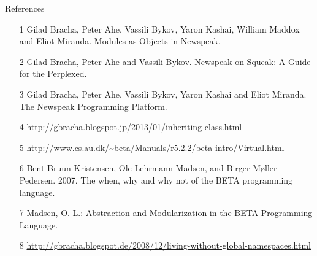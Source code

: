 \documentclass[xcolor=dvipsname,handout]{beamer} %
\begin{document}
\begin{frame}{References}
\footnotesize
\begin{itemize}
  \item [1] Gilad Bracha, Peter Ahe, Vassili Bykov, Yaron Kashai, William Maddox and Eliot Miranda. Modules as Objects in Newspeak.
  \item [2] Gilad Bracha, Peter Ahe and Vassili Bykov. Newspeak on Squeak: A Guide for the Perplexed.
  \item [3] Gilad Bracha, Peter Ahe, Vassili Bykov, Yaron Kashai and Eliot Miranda. The Newspeak Programming Platform. 
  \item [4] \url{http://gbracha.blogspot.jp/2013/01/inheriting-class.html}
  \item [5] \url{http://www.cs.au.dk/~beta/Manuals/r5.2.2/beta-intro/Virtual.html}
  \item [6] Bent Bruun Kristensen, Ole Lehrmann Madsen, and Birger Møller-Pedersen. 2007. The when, why and why not of the BETA programming language.
  \item [7]  Madsen, O. L.: Abstraction and Modularization in the BETA Programming Language.
  \item [8] \url{http://gbracha.blogspot.de/2008/12/living-without-global-namespaces.html}
\end{itemize}
\end{frame}
\end{document}
